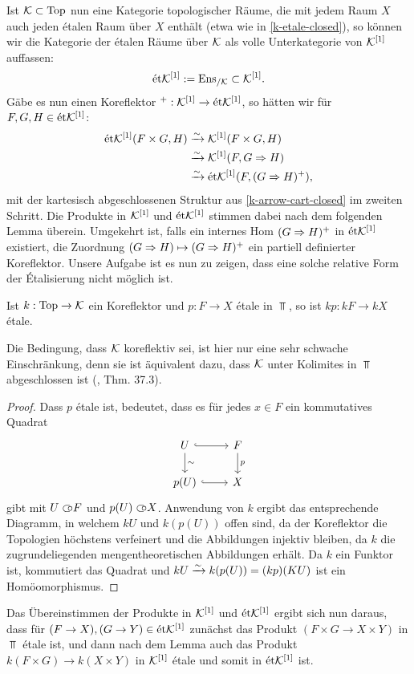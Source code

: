 Ist $\mathcal{K} \subset \operatorname{Top}$ nun eine Kategorie topologischer Räume, die mit
jedem Raum $X$ auch jeden étalen Raum über $X$ enthält (etwa wie in
\ref{k-etale-closed}), so können wir die Kategorie der étalen Räume
über $\mathcal{K}$ als volle Unterkategorie von $\mathcal{K}^{[1]}$ auffassen:
\[ \mathrm{\acute{e}t} \mathcal{K}^{[1]} := \operatorname{Ens}_{/\mathcal{K}} \subset \mathcal{K}^{[1]}. \]
Gäbe es nun einen Koreflektor $^+: \mathcal{K}^{[1]} \to \mathrm{\acute{e}t} \mathcal{K}^{[1]}$, so hätten wir
für $F, G, H \in \mathrm{\acute{e}t} \mathcal{K}^{[1]}$:
\begin{align*}
  \mathrm{\acute{e}t} \mathcal{K}^{[1]}(F \times G, H)
  &\xrightarrow[]{\sim} \mathcal{K}^{[1]}(F \times G, H) \\
  &\xrightarrow[]{\sim} \mathcal{K}^{[1]}(F, G \Rightarrow H) \\
  &\xrightarrow[]{\sim} \mathrm{\acute{e}t} \mathcal{K}^{[1]}(F, (G \Rightarrow H)^+),
\end{align*}
mit der kartesisch abgeschlossenen Struktur aus
\ref{k-arrow-cart-closed} im zweiten Schritt. Die Produkte in
$\mathcal{K}^{[1]}$ und $\mathrm{\acute{e}t} \mathcal{K}^{[1]}$ stimmen dabei nach dem folgenden Lemma
überein. Umgekehrt ist, falls ein internes Hom $(G \Rightarrow H)^+$ in $\mathrm{\acute{e}t}
\mathcal{K}^{[1]}$ existiert, die Zuordnung $(G \Rightarrow H) \mapsto (G \Rightarrow H)^+$
ein partiell definierter Koreflektor. Unsere Aufgabe ist es nun zu
zeigen, dass eine solche relative Form der Étalisierung nicht möglich
ist.

\begin{lemma}
  Ist $k: \operatorname{Top} \to \mathcal{K}$ ein Koreflektor und $p: F \to X$ étale in
  $\Top$, so ist $kp: kF \to kX$ étale.
\end{lemma}
\begin{bem}
  Die Bedingung, dass $\mathcal{K}$ koreflektiv sei, ist hier nur eine sehr
  schwache Einschränkung, denn sie ist äquivalent dazu, dass $\mathcal{K}$
  unter Kolimites in $\Top$ abgeschlossen ist (\cite{Herrlich},
  Thm. 37.3).
\end{bem}
\begin{proof}
  Dass $p$ étale ist, bedeutet, dass es für jedes $x \in F$ ein
  kommutatives Quadrat
  \[ 
  \begin{tikzcd}
    U \dar{\sim} \rar[hook] & F \dar{p} \\
    p(U) \rar[hook] & X
  \end{tikzcd}
  \]
  gibt mit $U \subset\kern-0.58em\circ F$ und $p(U) \subset\kern-0.58em\circ X$. Anwendung von $k$ ergibt
  das entsprechende Diagramm, in welchem $kU$ und $k(p(U))$ offen
  sind, da der Koreflektor die Topologien höchstens verfeinert und die
  Abbildungen injektiv bleiben, da $k$ die zugrundeliegenden
  mengentheoretischen Abbildungen erhält. Da $k$ ein Funktor ist,
  kommutiert das Quadrat und $kU \xrightarrow[]{\sim} k(p(U)) = (kp)(KU)$ ist ein
  Homöomorphismus.
\end{proof}
Das Übereinstimmen der Produkte in $\mathcal{K}^{[1]}$ und $\mathrm{\acute{e}t} \mathcal{K}^{[1]}$ ergibt sich
nun daraus, dass für $(F \to X), (G \to Y) \in \mathrm{\acute{e}t} \mathcal{K}^{[1]}$ zunächst das
Produkt $(F \times G \to X \times Y)$ in $\Top$ étale ist, und dann
nach dem Lemma auch das Produkt $k(F \times G) \to k(X \times Y)$ in
$\mathcal{K}^{[1]}$ étale und somit in $\mathrm{\acute{e}t} \mathcal{K}^{[1]}$ ist.

